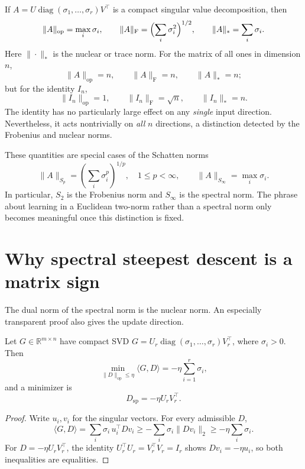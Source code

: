 If \(A=U\operatorname{diag}(\sigma_1,\ldots,\sigma_r)V^\top\) is a compact singular value decomposition, then
\[
 \|A\|_{\mathrm{op}}=\max_i\sigma_i,\qquad
 \|A\|_{\mathrm F}=\Bigl(\sum_i\sigma_i^2\Bigr)^{1/2},
 \qquad
 \|A\|_*=\sum_i\sigma_i.
\]
Here \(\|\cdot\|_*\) is the nuclear or trace norm.  For the matrix of all ones in dimension \(n\),
\[
 \|A\|_{\mathrm{op}}=n,\qquad
 \|A\|_{\mathrm F}=n,\qquad
 \|A\|_*=n;
\]
but for the identity \(I_n\),
\[
 \|I_n\|_{\mathrm{op}}=1,\qquad
 \|I_n\|_{\mathrm F}=\sqrt n,\qquad
 \|I_n\|_*=n.
\]
The identity has no particularly large effect on any \emph{single} input direction.  Nevertheless, it acts nontrivially on \emph{all} \(n\) directions, a distinction detected by the Frobenius and nuclear norms.

These quantities are special cases of the Schatten norms
\[
 \|A\|_{S_p}=\left(\sum_i\sigma_i^p\right)^{1/p},
 \quad 1\leq p<\infty,
 \qquad
 \|A\|_{S_\infty}=\max_i\sigma_i.
\]
In particular, \(S_2\) is the Frobenius norm and \(S_\infty\) is the spectral norm.  The phrase about learning in a Euclidean two-norm rather than a spectral norm only becomes meaningful once this distinction is fixed.

\section{Why spectral steepest descent is a matrix sign}

The dual norm of the spectral norm is the nuclear norm.  An especially transparent proof also gives the update direction.

\begin{proposition}
Let \(G\in\mathbb R^{m\times n}\) have compact SVD
\(
 G=U_r\operatorname{diag}(\sigma_1,\ldots,\sigma_r)V_r^\top
\),
where \(\sigma_i>0\).  Then
\[
 \min_{\|D\|_{\mathrm{op}}\leq\eta}
       \langle G,D\rangle
 =-\eta\sum_{i=1}^r\sigma_i,
\]
and a minimizer is
\begin{equation}
 D_{\mathrm{sp}}=-\eta U_rV_r^\top.
 \label{eq:N20261017-matrix-sign}
\end{equation}
\end{proposition}

\begin{proof}
Write \(u_i,v_i\) for the singular vectors.  For every admissible \(D\),
\[
 \langle G,D\rangle
 =\sum_i\sigma_i\,u_i^\top Dv_i
 \geq-\sum_i\sigma_i\|Dv_i\|_2
 \geq-\eta\sum_i\sigma_i.
\]
For \(D=-\eta U_rV_r^\top\), the identity \(U_r^\top U_r=V_r^\top V_r=I_r\)
shows \(Dv_i=-\eta u_i\), so both inequalities are equalities.
\end{proof}

